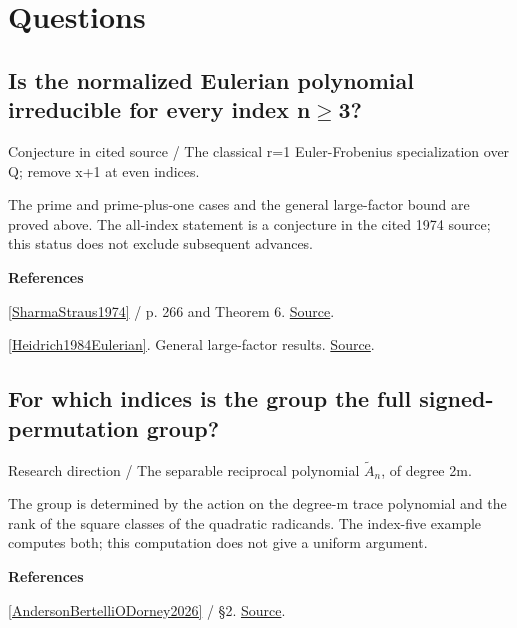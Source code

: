 \documentclass[11pt,a4paper,oneside,openany]{book}
\newenvironment{sources}{\par\smallskip\begingroup\footnotesize\color{atlasgray}\leftskip=10pt\setlength{\parskip}{2pt}}{\par\endgroup\smallskip}
\begin{document}
\section*{Questions}
\subsection*{Is the normalized Eulerian polynomial irreducible for every index n\ensuremath{\ge}3?}
{\small\sffamily\color{atlasgold}Conjecture in cited source / The classical r=1 Euler-Frobenius specialization over Q; remove x+1 at even indices.}\par\smallskip
\color{black} The prime and prime-plus-one cases and the general large-factor bound are proved above. The all-index statement is a conjecture in the cited 1974 source; this status does not exclude subsequent advances.\par
\begin{sources}
\textbf{References}\par\smallskip
\noindent\hyperlink{ref:SharmaStraus1974}{[SharmaStraus1974]} / p. 266 and Theorem 6.  \href{https://doi.org/10.4153/CMB-1974-052-x}{Source}.\par
\noindent\hyperlink{ref:Heidrich1984Eulerian}{[Heidrich1984Eulerian]}. General large-factor results. \href{https://doi.org/10.1016/0022-314X(84)90050-7}{Source}.\par
\end{sources}\color{black}
\subsection*{For which indices is the group the full signed-permutation group?}
{\small\sffamily\color{atlasgold}Research direction / The separable reciprocal polynomial \(\widetilde A_n\), of degree 2m.}\par\smallskip
\color{black} The group is determined by the action on the degree-m trace polynomial and the rank of the square classes of the quadratic radicands. The index-five example computes both; this computation does not give a uniform argument.\par
\begin{sources}
\textbf{References}\par\smallskip
\noindent\hyperlink{ref:AndersonBertelliODorney2026}{[AndersonBertelliODorney2026]} / §2.  \href{https://arxiv.org/abs/2406.18970v2}{Source}.\par
\end{sources}\color{black}
\end{document}

